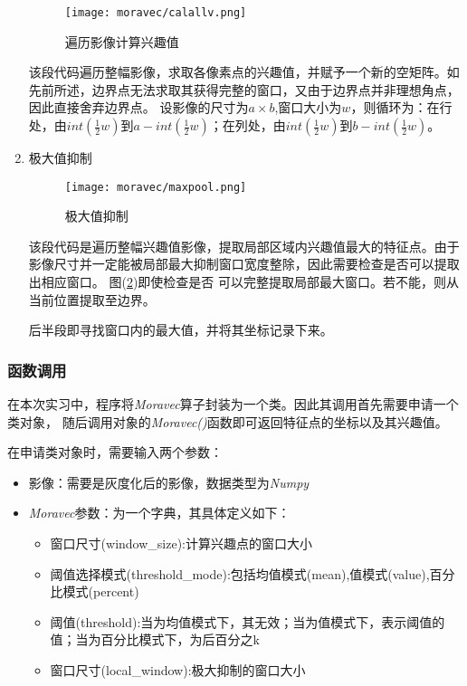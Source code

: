 \begin{enumerate}
            \begin{figure}[H]
                \centering 
                \texttt{[image: moravec/calallv.png]}
                \caption{遍历影像计算兴趣值}
                \label{allwindowVcode}
            \end{figure}

            \hspace{20pt}该段代码遍历整幅影像，求取各像素点的兴趣值，并赋予一个新的空矩阵。如先前所述，边界点无法求取其获得完整的窗口，又由于边界点并非理想角点，因此直接舍弃边界点。
            设影像的尺寸为$a \times b$,窗口大小为$w$，则循环为：在行处，由$int(\frac{1}{2}w)$到$a-int(\frac{1}{2}w)$；在列处，由$int(\frac{1}{2}w)$到$b-int(\frac{1}{2}w)$。

            \item 极大值抑制
            \begin{figure}[H]
                \centering 
                \texttt{[image: moravec/maxpool.png]}
                \caption{极大值抑制}
                \label{maxpoolcode}
            \end{figure}

            \hspace{20pt}该段代码是遍历整幅兴趣值影像，提取局部区域内兴趣值最大的特征点。由于影像尺寸并一定能被局部最大抑制窗口宽度整除，因此需要检查是否可以提取出相应窗口。
            图(\ref{maxpoolcode})即使检查是否
            可以完整提取局部最大窗口。若不能，则从当前位置提取至边界。

            \hspace{20pt}后半段即寻找窗口内的最大值，并将其坐标记录下来。
        \end{enumerate}

    \subsubsection{函数调用}
        在本次实习中，程序将\textit{Moravec}算子封装为一个类。因此其调用首先需要申请一个类对象，
        随后调用对象的\textit{Moravec()}函数即可返回特征点的坐标以及其兴趣值。

        在申请类对象时，需要输入两个参数：
        \begin{itemize}
            \item 影像：需要是灰度化后的影像，数据类型为\textit{Numpy}
            \item \textit{Moravec}参数：为一个字典，其具体定义如下：
            \begin{itemize}
                \item 窗口尺寸(window\_size):计算兴趣点的窗口大小
                \item 阈值选择模式(threshold\_mode):包括均值模式(mean),值模式(value),百分比模式(percent)
                \item 阈值(threshold):当为均值模式下，其无效；当为值模式下，表示阈值的值；当为百分比模式下，为后百分之k
                \item 窗口尺寸(local\_window):极大抑制的窗口大小
            \end{itemize}

        \end{itemize}

